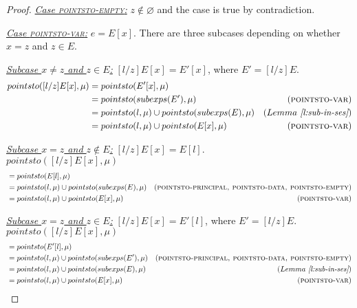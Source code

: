 \documentclass{llncs}
\begin{document}
\begin{proof}
\noindent\underline{\textit{Case \textsc{pointsto-empty}:}} $z \not\in \varnothing$ and the case is true by contradiction.

\noindent\underline{\textit{Case \textsc{pointsto-var}:}} $e = E[x]$. There are three subcases depending on whether $x = z$ and $z \in E$.

\noindent\underline{\textit{Subcase $x \neq z$ and $z \in E$:}} $[l / z]E[x] = E'[x]$, where $E' = [l / z]E$.
\begin{align*}
pointsto([l / z]E[x], \mu) &= pointsto(E'[x], \mu)\\
&= pointsto(subexps(E'), \mu) & (\textsc{pointsto-var})\\
&= pointsto(l, \mu) \cup pointsto(subexps(E), \mu) & (Lemma~\textit{\ref{l:sub-in-ses}})\\
&= pointsto(l, \mu) \cup pointsto(E[x], \mu) & (\textsc{pointsto-var})
\end{align*}

\noindent\underline{\textit{Subcase $x = z$ and $z \not\in E$:}} $[l / z]E[x] = E[l]$.\\
$pointsto([l / z]E[x], \mu)$
\vspace{-7pt}
\begin{align*}
&= pointsto(E[l], \mu)\\
&= pointsto(l, \mu) \cup pointsto(subexps(E), \mu) & (\textsc{pointsto-principal, pointsto-data, pointsto-empty})\\
&= pointsto(l, \mu) \cup pointsto(E[x], \mu) & (\textsc{pointsto-var})
\end{align*}

\noindent\underline{\textit{Subcase $x = z$ and $z \in E$:}} $[l / z]E[x] = E'[l]$, where $E' = [l / z]E$.\\
$pointsto([l / z]E[x], \mu)$
\vspace{-7pt}
\begin{align*}
&= pointsto(E'[l], \mu)\\
&= pointsto(l, \mu) \cup pointsto(subexps(E'), \mu) & (\textsc{pointsto-principal, pointsto-data, pointsto-empty})\\
&= pointsto(l, \mu) \cup pointsto(subexps(E), \mu) & (Lemma~\textit{\ref{l:sub-in-ses}})\\
&= pointsto(l, \mu) \cup pointsto(E[x], \mu) & (\textsc{pointsto-var})
\end{align*}


\end{proof}
\end{document}

